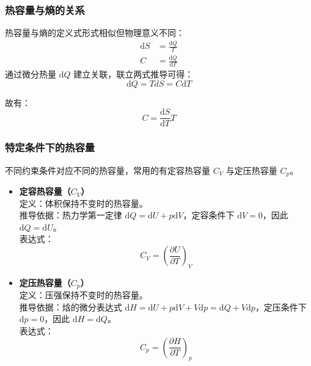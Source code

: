 \documentclass{article}
\begin{document}
	\subsubsection{热容量与熵的关系}
	热容量与熵的定义式形式相似但物理意义不同：
	\begin{align*}
		\mathrm{d}S&=\frac{\mathrm{d}Q}{T} \\
		C&=\frac{\mathrm{d}Q}{\mathrm{d}T}
	\end{align*}
	通过微分热量 $\mathrm{d}Q$ 建立关联，联立两式推导可得：
	\[
	\mathrm{d}Q=TdS=C\mathrm{d}T
	\]
	
	故有：
	\[
	C = \frac{\mathrm{d} S}{\mathrm{d} T} T
	\]
	\subsubsection{特定条件下的热容量}
	不同约束条件对应不同的热容量，常用的有定容热容量 $C_V$ 与定压热容量 $C_p$。
	\begin{itemize}[leftmargin=2em, itemsep=0.8em]
		\item \textbf{定容热容量（$C_V$）} \\
		定义：体积保持不变时的热容量。 \\
		推导依据：热力学第一定律 $\mathrm{d}Q=\mathrm{d}U+p\mathrm{d}V$，定容条件下 $\mathrm{d}V=0$，因此 $\mathrm{d}Q=\mathrm{d}U$。 \\
		表达式：
		\[
		C_V=\left(\frac{\partial U}{\partial T}\right)_V
		\]
		
		\item \textbf{定压热容量（$C_p$）} \\
		定义：压强保持不变时的热容量。 \\
		推导依据：焓的微分表达式 $\mathrm{d}H=\mathrm{d}U+p\mathrm{d}V+V\mathrm{d}p=\mathrm{d}Q+V\mathrm{d}p$，定压条件下 $\mathrm{d}p=0$，因此 $\mathrm{d}H=\mathrm{d}Q$。 \\
		表达式：
		\[
		C_p=\left(\frac{\partial H}{\partial T}\right)_p
		\]
		
		
	\end{itemize}
	
\end{document}
